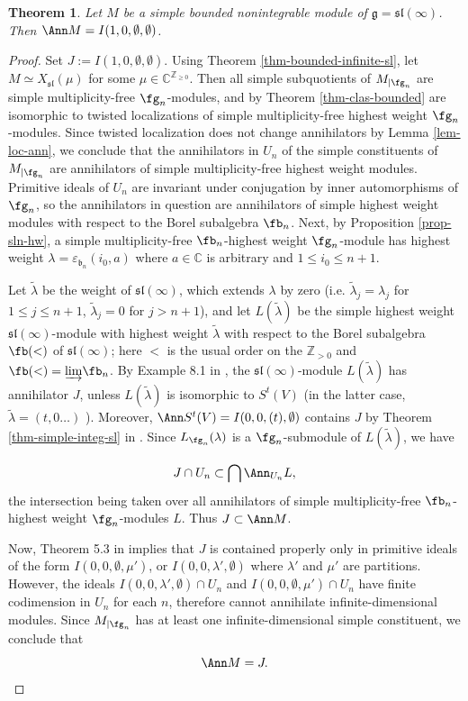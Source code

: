 \documentclass[12pt]{amsart}
\def\gb{\mathfrak{b}}
\def\gg{\mathfrak{g}}
\newtheorem{thm}{Theorem}[section]
\begin{document}
\begin{thm} \label{thm-ann-nonint-sl}
Let $M$ be a simple bounded nonintegrable module of  $ \gg=\mathfrak{sl} (\infty)$. Then $\Ann M = I(1,0,\emptyset,\emptyset)$.
\end{thm}
\begin{proof}
Set $J:=I(1,0,\emptyset,\emptyset)$. Using Theorem \ref{thm-bounded-infinite-sl}, let $M \simeq X_{\mathfrak{sl}}(\mu)$ for some $\mu \in {\mathbb C}^{{\mathbb Z}_{\geq 0}}$.  Then all simple subquotients of $M_{|\fg_n}$ are simple multiplicity-free $\fg_n$-modules, and by Theorem \ref{thm-clas-bounded} are isomorphic to twisted localizations of simple multiplicity-free highest weight $\fg_n$-modules. Since twisted localization does not change annihilators by Lemma \ref{lem-loc-ann}, we conclude that the annihilators in $U_n$ of the simple constituents of $M_{|\fg_n}$ are annihilators of simple multiplicity-free highest weight modules.  Primitive ideals of $U_n$ are invariant under conjugation by inner automorphisms of $\fg_n$, so the annihilators in question are annihilators of simple highest weight modules with respect to the Borel subalgebra $\fb_n$.  Next, by Proposition \ref{prop-sln-hw}, a simple multiplicity-free $\fb_n$-highest weight $\fg_n$-module has highest weight $\lambda=\varepsilon_{\gb_n} (i_0,a)$
where $a\in\mathbb{C}$ is arbitrary  and $1\leq i_0\leq n+1$.

Let $\tilde\lambda$ be the weight of $\mathfrak{sl}(\infty)$, which extends $\lambda$ by zero (i.e. $\tilde\lambda_j=\lambda_j$ for $1\leq j\leq n+1$, $\tilde\lambda_j=0$ for $j>n+1$), and let $L(\tilde\lambda)$ be the simple highest weight $\mathfrak{sl}(\infty)$-module with highest weight $\tilde\lambda$ with respect to the Borel subalgebra $\fb(<)$ of $\mathfrak{sl}(\infty)$; here $<$ is the usual order on the $\mathbb{Z}_{>0}$ and $\fb(<)=\underrightarrow\lim\fb_n$. By Example 8.1 in \cite{PP2}, the  $\mathfrak{sl} (\infty)$-module $L(\tilde\lambda)$ has annihilator $J$, unless $L(\tilde\lambda)$ is isomorphic to $S^t (V)$ (in the latter case, $\tilde\lambda=(t,0\dots)$ ). Moreover, $ \Ann S^t (V)=I(0, 0, (t), \emptyset)$ contains $J$ by Theorem \ref{thm-simple-integ-sl} in \cite{PP}. Since $L_{\fg_n}(\lambda)$ is a $\fg_n$-submodule of $L(\tilde\lambda)$, we have


\begin{equation}\label{eq-inter}
 J \cap U_n \subset \bigcap \Ann_{U_n} L,
\end{equation}
the intersection being taken over all annihilators of simple multiplicity-free $\fb_n$-highest weight $\fg_n$-modules $L$.
Thus $J \subset \Ann M$. 

Now, Theorem 5.3 in \cite{PP} implies that $J$ is contained properly only in primitive ideals of the form $I(0,0,\emptyset, \mu')$, or  $ I(0,0,\lambda', \emptyset)$ where $\lambda'$ and $\mu'$ are partitions. However, the ideals $I(0,0,\lambda', \emptyset) \cap U_n$ and $I(0,0,\emptyset, \mu') \cap U_n$  have finite codimension in $U_n$ for each $n$, therefore  cannot annihilate infinite-dimensional modules. Since $M_{|\fg_n}$ has at least one infinite-dimensional simple constituent, we conclude that 
$$\Ann M = J. $$ \end{proof}
\end{document}
